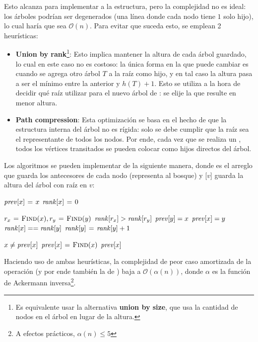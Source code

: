 \documentclass[a4paper]{report}
\newcommand{\BigO}[1]{\ensuremath{\mathcal{O}(#1)}}
\begin{document}
Esto alcanza para implementar a la estructura, pero la complejidad no es ideal: los árboles podrían ser degenerados (una línea donde cada nodo tiene $1$ solo hijo), lo cual haría que  sea \BigO{n}. Para evitar que suceda esto, se emplean 2 heurísticas:
\begin{itemize}
    \item \textbf{Union by rank}\footnote{Es equivalente usar la alternativa \textbf{union by size}, que usa la cantidad de nodos en el árbol en lugar de la altura.}: Esto implica mantener la altura de cada árbol guardado, lo cual en este caso no es costoso: la única forma en la que puede cambiar es cuando se agrega otro árbol $T$ a la raíz como hijo, y en tal caso la altura pasa a ser el mínimo entre la anterior y $h(T) + 1$. Esto se utiliza a la hora de decidir qué raíz utilizar para el nuevo árbol de : se elije la que resulte en menor altura.
    \item \textbf{Path compression}: Esta optimización se basa en el hecho de que la estructura interna del árbol no es rígida: solo se debe cumplir que la raíz sea el representante de todos los nodos. Por ende, cada vez que se realiza un , todos los vértices transitados se pueden colocar como hijos directos del árbol.
\end{itemize}

Los algoritmos se pueden implementar de la siguiente manera, donde  es el arreglo que guarda los antecesores de cada nodo (representa al bosque) y [$v$] guarda la altura del árbol con raíz en $v$:
\begin{codebox}
    \li $\id{prev}[x] \gets x$
    \li $\id{rank}[x] \gets 0$
\end{codebox}
\begin{codebox}
    \li $r_x \mathrel{\hspace{1pt}=\hspace{1pt}} \textnormal{\scshape Find}(x), r_y \mathrel{\hspace{1pt}=\hspace{1pt}} \textnormal{\scshape Find}(y)$
    \li \If $\id{rank}[r_x] > \id{rank}[r_y]$ \Then
    \li $\id{prev}[y] = x$
    \li \Else
    \li $\id{prev}[x] = y$
    \li \If $\id{rank}[x] == \id{rank}[y]$ \Then
    \li $\id{rank}[y] \gets \id{rank}[y] + 1$
    \End
    \End
\end{codebox}
\begin{codebox}
    \li \If $x \neq \id{prev}[x]$ \Then
    \li $\id{prev}[x] \gets \proc{Find}(x)$
    \End
    \li \Return $\id{prev}[x]$
\end{codebox}

Haciendo uso de ambas heurísticas, la complejidad de peor caso amortizada de la operación  (y por ende también la de ) baja a \BigO{\alpha(n)}, donde $\alpha$ es la función de Ackermann inversa\footnote{A efectos prácticos, $\alpha(n) \leq 5$}.
\end{document}
